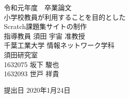 \documentclass[a4j,10pt]{jsarticle}
\begin{document}
\setcounter{tocdepth}{3}
\thispagestyle{empty}
\begin{center}
\huge
令和元年度　卒業論文\\[50pt]


\HUGE
小学校教員が利用することを目的とした\\
Scratch課題集サイトの制作\\[50pt]
\huge
指導教員 須田 宇宙 准教授\\[40pt]
千葉工業大学 情報ネットワーク学科\\[10pt]
須田研究室\\[60pt]
1632075 \hspace{70pt} 坂下 駿也\\[75pt]
1632093 \hspace{70pt} 世戸 祥貴\\[75pt]
\end{center}
\begin{flushright}
\huge



提出日 2020年1月24日
\end{flushright}
\newpage


\pagestyle{empty}
\large
\tableofcontents
\listoftables
\listoffigures
\newpage


\pagestyle{plain}
\setcounter{page}{1}


























\end{document}
